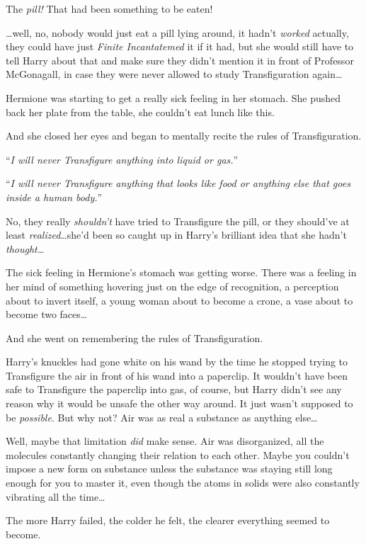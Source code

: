 The \emph{pill!} That had been something to be eaten!

…well, no, nobody would just eat a pill lying around, it hadn’t \emph{worked} actually, they could have just \emph{Finite Incantatemed} it if it had, but she would still have to tell Harry about that and make sure they didn’t mention it in front of Professor McGonagall, in case they were never allowed to study Transfiguration again…

Hermione was starting to get a really sick feeling in her stomach. She pushed back her plate from the table, she couldn’t eat lunch like this.

And she closed her eyes and began to mentally recite the rules of Transfiguration.

“\emph{I will never Transfigure anything into liquid or gas.}”

“\emph{I will never Transfigure anything that looks like food or anything else that goes inside a human body.}”

No, they really \emph{shouldn’t} have tried to Transfigure the pill, or they should’ve at least \emph{realized}…she’d been so caught up in Harry’s brilliant idea that she hadn’t \emph{thought…}

The sick feeling in Hermione’s stomach was getting worse. There was a feeling in her mind of something hovering just on the edge of recognition, a perception about to invert itself, a young woman about to become a crone, a vase about to become two faces…

And she went on remembering the rules of Transfiguration.

\later

Harry’s knuckles had gone white on his wand by the time he stopped trying to Transfigure the air in front of his wand into a paperclip. It wouldn’t have been safe to Transfigure the paperclip into gas, of course, but Harry didn’t see any reason why it would be unsafe the other way around. It just wasn’t supposed to be \emph{possible}. But why not? Air was as real a substance as anything else…

Well, maybe that limitation \emph{did} make sense. Air was disorganized, all the molecules constantly changing their relation to each other. Maybe you couldn’t impose a new form on substance unless the substance was staying still long enough for you to master it, even though the atoms in solids were also constantly vibrating all the time…

The more Harry failed, the colder he felt, the clearer everything seemed to become.


